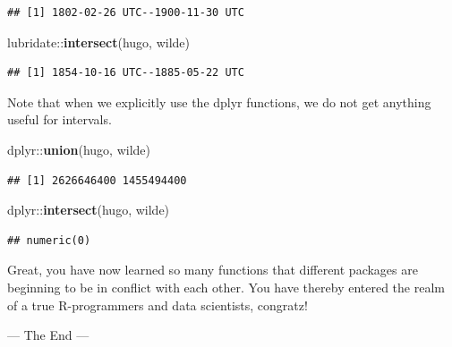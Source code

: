 \documentclass[]{tufte-book}
\newenvironment{Shaded}{}{}
\newcommand{\KeywordTok}[1]{\textcolor[rgb]{0.00,0.44,0.13}{\textbf{#1}}}
\newcommand{\NormalTok}[1]{#1}
\newcommand{\OperatorTok}[1]{\textcolor[rgb]{0.40,0.40,0.40}{#1}}
\begin{document}
\begin{verbatim}
## [1] 1802-02-26 UTC--1900-11-30 UTC
\end{verbatim}

\begin{Shaded}
\begin{Highlighting}[]
\NormalTok{lubridate}\OperatorTok{::}\KeywordTok{intersect}\NormalTok{(hugo, wilde)}
\end{Highlighting}
\end{Shaded}

\begin{verbatim}
## [1] 1854-10-16 UTC--1885-05-22 UTC
\end{verbatim}

Note that when we explicitly use the dplyr functions, we do not get anything useful for intervals.

\begin{Shaded}
\begin{Highlighting}[]
\NormalTok{dplyr}\OperatorTok{::}\KeywordTok{union}\NormalTok{(hugo, wilde)}
\end{Highlighting}
\end{Shaded}

\begin{verbatim}
## [1] 2626646400 1455494400
\end{verbatim}

\begin{Shaded}
\begin{Highlighting}[]
\NormalTok{dplyr}\OperatorTok{::}\KeywordTok{intersect}\NormalTok{(hugo, wilde)}
\end{Highlighting}
\end{Shaded}

\begin{verbatim}
## numeric(0)
\end{verbatim}

Great, you have now learned so many functions that different packages are beginning to be in conflict with each other. You have thereby entered the realm of a true R-programmers and data scientists, congratz!

--- The End ---


\end{document}
